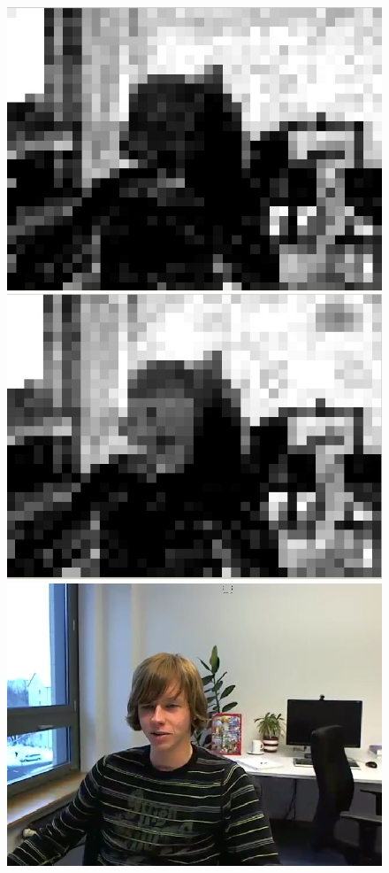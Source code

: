 \documentclass[11pt]{article} %
\begin{document}
\begin{figure}[!h]
    \centering
    \includegraphics[scale=0.4]{PaulDefault120_91250kbps_psnr}
    \includegraphics[scale=0.4]{BufferControl/paul120_250kbps_BufferControl_psnr}
    \includegraphics[scale=0.4]{PaulDefault120_91250kbps}

\end{figure}
\end{document}
